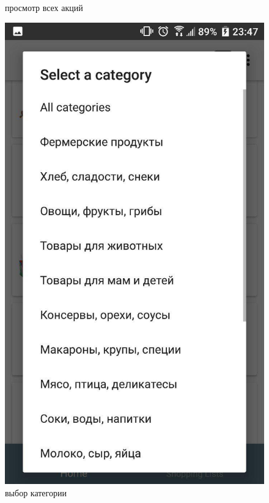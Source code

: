 \begin{figure}[h!]
    \caption{\small{просмотр всех акций}}
    \endminipage\hfill
    \includegraphics[height=0.38\textheight]{./screenshots/3/categories.jpg}
    \caption{\small{выбор категории}}
    \endminipage\hfill

\end{figure}
